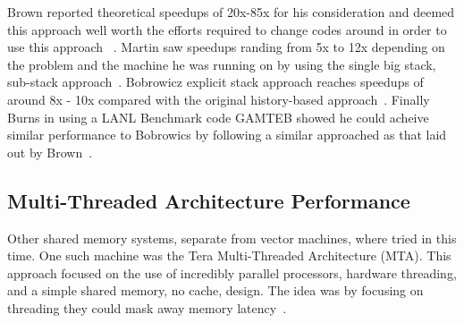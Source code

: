 %
Brown reported theoretical speedups of 20x-85x for his consideration and deemed this approach well worth the efforts required to change codes around in order to use this approach ~\cite{brown1984monte}.
%
Martin saw speedups randing from 5x to 12x depending on the problem and the machine he was running on by using the single big stack, sub-stack approach~\cite{martin1986monte}.
%
Bobrowicz explicit stack approach reaches speedups of around 8x - 10x compared with the original history-based approach~\cite{bobrowicz1984vectorized}.
%
Finally Burns in using a LANL Benchmark code GAMTEB showed he could acheive similar performance to Bobrowics by following a similar approached as that laid out by Brown~\cite{burns1989vectorization}.
%

\subsection*{Multi-Threaded Architecture Performance}

%
Other shared memory systems, separate from vector machines, where tried in this time.
%
One such machine was the Tera Multi-Threaded Architecture (MTA).
%
This approach focused on the use of incredibly parallel processors, hardware threading, and a simple shared memory, no cache, design.
%
The idea was by focusing on threading they could mask away memory latency~\cite{majumdar2000parallel, snavely1998multi}.
%


